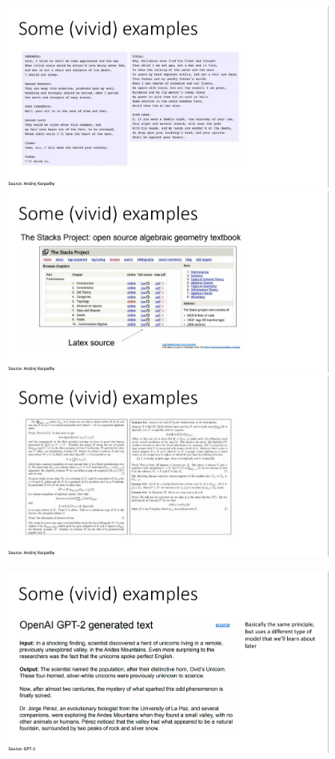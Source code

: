 \documentclass{book}
\begin{document}
\begin{figure}[H]
    \centering
    \includegraphics[width=0.95\textwidth]{images/lec10_28.png}
    \includegraphics[width=0.95\textwidth]{images/lec10_29.png}
    \includegraphics[width=0.95\textwidth]{images/lec10_30.png}
\end{figure}
\begin{figure}[H]
    \centering
    \includegraphics[width=0.95\textwidth]{images/lec10_31.png}
\end{figure}
\end{document}
